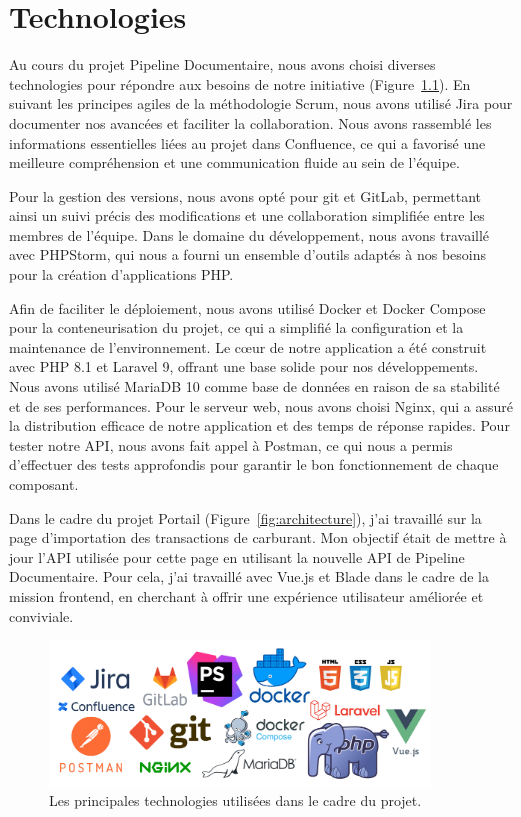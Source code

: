 \chapter{Technologies}\label{ch:technologies}

Au cours du projet Pipeline Documentaire, nous avons choisi diverses technologies pour répondre aux besoins de notre initiative (Figure~\ref{fig:technologies}). En suivant les principes agiles de la méthodologie Scrum, nous avons utilisé Jira pour documenter nos avancées et faciliter la collaboration. Nous avons rassemblé les informations essentielles liées au projet dans Con\-flu\-ence, ce qui a favorisé une meilleure compréhension et une communication fluide au sein de l'équipe.

Pour la gestion des versions, nous avons opté pour git et GitLab, permettant ainsi un suivi précis des modifications et une collaboration simplifiée entre les membres de l'équipe. Dans le domaine du développement, nous avons travaillé avec PHP\-Storm, qui nous a fourni un ensemble d'outils adaptés à nos besoins pour la création d'applications PHP.

Afin de faciliter le déploiement, nous avons utilisé Docker et Docker Compose pour la conteneurisation du projet, ce qui a simplifié la configuration et la maintenance de l'environnement. Le cœur de notre application a été construit avec PHP 8.1 et Laravel 9, offrant une base solide pour nos développements. Nous avons utilisé MariaDB 10 comme base de données en raison de sa stabilité et de ses performances. Pour le serveur web, nous avons choisi Nginx, qui a assuré la distribution efficace de notre application et des temps de réponse rapides. Pour tester notre API, nous avons fait appel à Postman, ce qui nous a permis d'effectuer des tests approfondis pour garantir le bon fonctionnement de chaque composant.

Dans le cadre du projet Portail (Figure~\ref{fig:architecture}), j'ai travaillé sur la page d'importation des transactions de carburant. Mon objectif était de mettre à jour l'API utilisée pour cette page en utilisant la nouvelle API de Pipeline Documentaire. Pour cela, j'ai travaillé avec Vue.js et Blade dans le cadre de la mission frontend, en cherchant à offrir une expérience utilisateur améliorée et conviviale.

\begin{figure}[ht]
    \centering
    \includegraphics[width=0.9\textwidth]{img/technologies}
    \caption{Les principales technologies utilisées dans le cadre du projet.}
    \label{fig:technologies}
\end{figure}